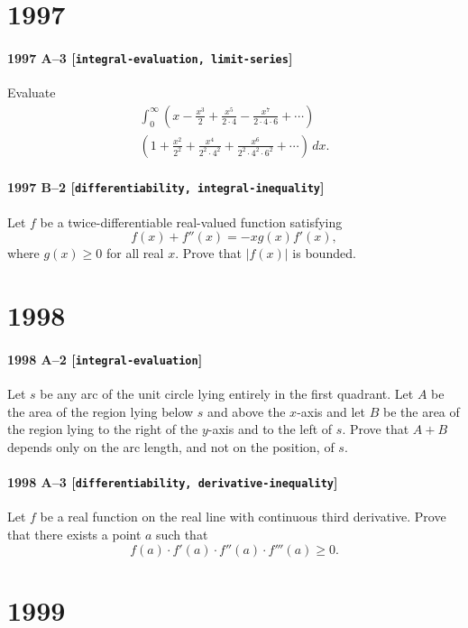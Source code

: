 \documentclass[11pt]{article}
\begin{document}
\section*{1997}

\paragraph{1997 A--3 \textnormal{[\texttt{integral-evaluation, limit-series}]}}
Evaluate
\begin{gather*}
\int_0^\infty \left(x-\frac{x^3}{2}+\frac{x^5}{2\cdot
4}-\frac{x^7}{2\cdot 4\cdot 6}+\cdots\right) \\
\left(1+\frac{x^2}{2^2}+
\frac{x^4}{2^2\cdot 4^2}+\frac{x^6}{2^2\cdot 4^2 \cdot 6^2}+\cdots\right)\,dx.
\end{gather*}

\paragraph{1997 B--2 \textnormal{[\texttt{differentiability, integral-inequality}]}}
Let $f$ be a twice-differentiable real-valued function satisfying
\[
f(x)+f''(x)=-xg(x)f'(x),
\]
where $g(x)\geq 0$ for all real $x$. Prove that $|f(x)|$ is bounded.

\section*{1998}

\paragraph{1998 A--2 \textnormal{[\texttt{integral-evaluation}]}}
Let $s$ be any arc of the unit circle lying entirely in the first
quadrant. Let $A$ be the area of the region lying below $s$ and
above the $x$-axis and let $B$ be the area of the region lying to the
right of the $y$-axis and to the left of $s$. Prove that $A+B$ depends
only on the arc length, and not on the position, of $s$.

\paragraph{1998 A--3 \textnormal{[\texttt{differentiability, derivative-inequality}]}}
Let $f$ be a real function on the real line with continuous third
derivative. Prove that there exists a point $a$ such that
\[f(a)\cdot f'(a) \cdot f''(a) \cdot f'''(a)\geq 0 .\]

\section*{1999}
\end{document}
